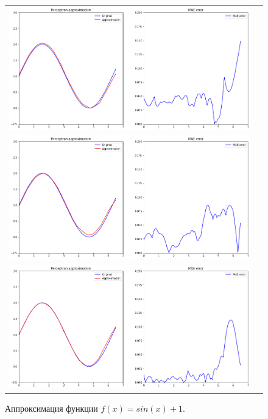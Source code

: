 \documentclass[12pt, a4paper]{article}
\begin{document}
    \begin{figure}[h]
        \center
        \begin{tabular}{cc}
            \includegraphics[width = 14cm]{f11_2_1.png} \\
            \includegraphics[width = 14cm]{f11_2_2.png} \\
            \includegraphics[width = 14cm]{f11_2_3.png} \\
        \end{tabular}
        \label{image2}
        \caption{Аппроксимация функции $f(x) = sin(x) + 1$.}
    \end{figure}
    
\end{document}
